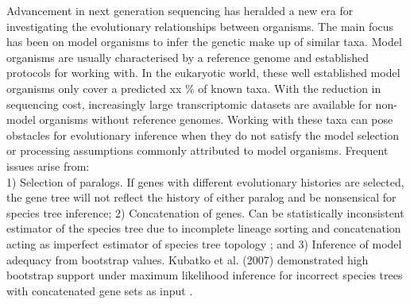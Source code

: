 \documentclass[12pt]{article}
\begin{document}
Advancement in next generation sequencing has heralded a new era for investigating the evolutionary relationships between organisms. 
The main focus has been on model organisms to infer the genetic make up of similar taxa. 
Model organisms are usually characterised by a reference genome and established protocols for working with. 
In the eukaryotic world, these well established model organisms only cover a predicted xx \% of known taxa. 
With the reduction in sequencing cost, increasingly large transcriptomic datasets are available for non-model organisms without reference genomes. 
Working with these taxa can pose obstacles for evolutionary inference when they do not satisfy the model selection or processing assumptions commonly attributed to model organisms. Frequent issues arise from:\\
1) Selection of paralogs. If genes with different evolutionary histories are selected, the gene tree will not reflect the history of either paralog and be nonsensical for species tree inference; 
2) Concatenation of genes. Can be statistically inconsistent estimator of the species tree due to incomplete lineage sorting and concatenation acting as imperfect estimator of species tree topology \cite{roch2015likelihood}; and 
3) Inference of model adequacy from bootstrap values. Kubatko et al. (2007) demonstrated high bootstrap support under maximum likelihood inference for incorrect species trees with concatenated gene sets as input \cite{kubatko2007inconsistency}. 
\end{document}
